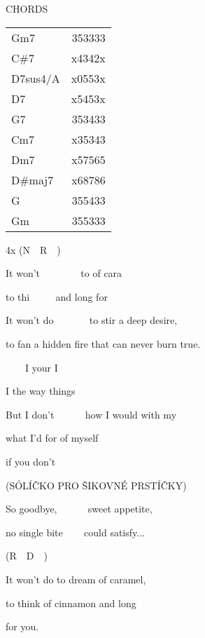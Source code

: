 

\ifdefined\TPBAND
CHORDS

\begin{tabular}{ l r }
  Gm7      &  353333\\
  C\#7      &  x4342x\\
  D7sus4/A &  x0553x\\
  D7       &  x5453x\\
  G7       &  353433\\
  Cm7      &  x35343\\
  Dm7      &  x57565\\
  D\#maj7   &  x68786\\
  G        &  355433\\
  Gm       &  355333\\
\end{tabular}
\fi

4x (N~~R~~)

\zs
It won't  ~~~~~~~ to  of cara

to thi ~~~~ and long for  ~  ~ 
\ks

\zs
It won't do ~~~~~~ to stir a deep desire,

to fan a hidden fire that can never burn true.
\ks

\zr
{}~~~~I  your  I  

I  the way  things 

But I don't  ~~~~~ how I would  with my

what I'd for of myself

if you don't  ~
\kr

\ifdefined\TPBAND
\zs (SÓLÍČKO PRO ŠIKOVNÉ PRSTÍČKY)\ks
\fi

\zs
So goodbye, ~~~~~ sweet appetite,

no single bite ~~~ could satisfy...
\ks

\zr\kr

(R~~D~~)

\zs
It won't do        to dream of caramel, 

to think of cinnamon      and long

for you.
\ks
\kp
